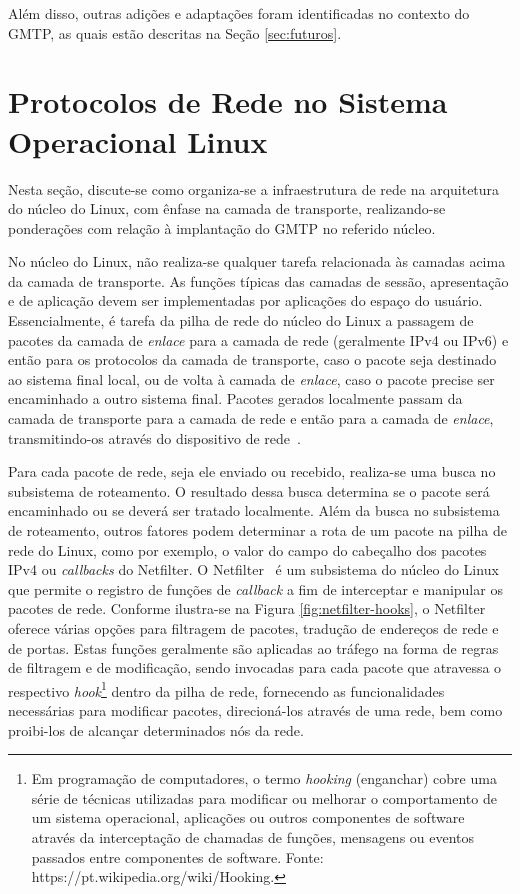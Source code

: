 Além disso, outras adições e adaptações foram identificadas no contexto do GMTP, as quais estão descritas na Seção \ref{sec:futuros}.

% 
% 
% 
%
\section{Protocolos de Rede no Sistema Operacional Linux}
\label{sec:inet}

Nesta seção, discute-se como organiza-se a infraestrutura de rede na arquitetura do núcleo do Linux, com ênfase na camada de transporte, realizando-se ponderações com relação à implantação do GMTP no referido núcleo.

No núcleo do Linux, não realiza-se qualquer tarefa relacionada às camadas acima da camada de transporte.
As funções típicas das camadas de sessão, apresentação e de aplicação devem ser implementadas por aplicações do espaço do usuário.
Essencialmente, é tarefa da pilha de rede do núcleo do Linux a passagem de pacotes da camada de \textit{enlace} para a camada de rede (geralmente IPv4 ou IPv6) e então para os protocolos da camada de transporte, caso o pacote seja destinado ao sistema final local, ou de volta à camada de \textit{enlace}, caso o pacote precise ser encaminhado a outro sistema final.
Pacotes gerados localmente passam da camada de transporte para a camada de rede e então para a camada de \textit{enlace}, transmitindo-os através do dispositivo de rede~\cite{rosen2013linux}.

Para cada pacote de rede, seja ele enviado ou recebido, realiza-se uma busca no subsistema de roteamento.
O resultado dessa busca determina se o pacote será encaminhado ou se deverá ser tratado localmente.
Além da busca no subsistema de roteamento, outros fatores podem determinar a rota de um pacote na pilha de rede do Linux, como por exemplo, o valor do campo  do cabeçalho dos pacotes IPv4 ou \textit{callbacks} do Netfilter. 
O Netfilter~\cite{netfilter.org} é um subsistema do núcleo do Linux que permite o registro de funções de \textit{callback} a fim de interceptar e manipular os pacotes de rede.  
Conforme ilustra-se na Figura \ref{fig:netfilter-hooks}, o Netfilter oferece várias opções para filtragem de pacotes, tradução de endereços de rede e de portas. 
Estas funções geralmente são aplicadas ao tráfego na forma de regras de filtragem e de modificação, sendo invocadas para cada pacote que atravessa o respectivo \textit{hook}\footnote{Em programação de computadores, o termo \textit{hooking} (enganchar) cobre uma série de técnicas utilizadas para modificar ou melhorar o comportamento de um sistema operacional, aplicações ou outros componentes de software através da interceptação de chamadas de funções, mensagens ou eventos passados entre componentes de software. Fonte: https://pt.wikipedia.org/wiki/Hooking.} dentro da pilha de rede, fornecendo as funcionalidades necessárias para modificar pacotes, direcioná-los através de uma rede, bem como proibi-los de alcançar determinados nós da rede.

